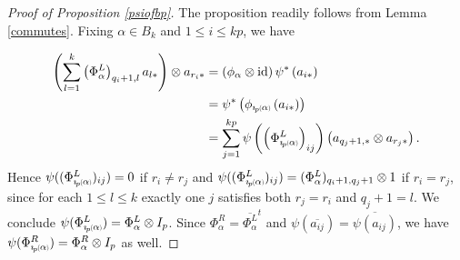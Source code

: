 \documentclass[11pt]{amsart}
\newcommand*{\subsmallp}[1]{\scalebox{.5}{\ensuremath#1}}
\newcommand{\subpp}[2][p]{\imath_{\hspace*{-1pt}#1}\hspace*{-.5pt}\subsmallp(#2\subsmallp)}
\newcommand\id{\operatorname{id}}
\theoremstyle{definition}
\begin{document}
\begin{proof}[Proof of Proposition \ref{psiofbp}]
The proposition readily follows from Lemma \ref{commutes}. Fixing $\alpha\in B_{k}$ and $1\le i\le kp$, we have

\begin{align*}
\left(\sum_{l=1}^k \left(\Phi_\alpha^L\right)_{q_i+1,l}a_{l*}\right)\otimes a_{r_i*} &= \left(\phi_{\alpha}\otimes \id\right)\psi^\ast\left(a_{i*}\right)\\
&= \psi^\ast\left(\phi_{\subpp{\alpha}}\left(a_{i*}\right)\right)\\
&= \sum_{j=1}^{kp} \psi\left(\left(\Phi_{\subpp{\alpha}}^L\right)_{ij}\right)\left(a_{q_j + 1,*}\otimes a_{r_j*}\right).\\
\end{align*}
\noindent Hence $\psi((\Phi_{\subpp{\alpha}}^L)_{ij}) = 0$ if $r_i \ne r_j$ and $\psi((\Phi_{\subpp{\alpha}}^L)_{ij}) = (\Phi_\alpha^L)_{q_i+1,q_j+1}\otimes 1$ if $r_i = r_j$, since for each $1\le l\le k$ exactly one $j$ satisfies both $r_j=r_i$ and $q_j+1=l$. We conclude $\psi(\Phi_{\subpp{\alpha}}^L) = \Phi_\alpha^L\otimes I_p$. Since $\Phi_\alpha^R = \overline{\Phi_\alpha^L}^t$ and $\psi(\overline{a_{ij}}) = \overline{\psi(a_{ij})}$, we have $\psi(\Phi_{\subpp{\alpha}}^R) = \Phi_\alpha^R\otimes I_p$ as well.
\end{proof}
\end{document}
